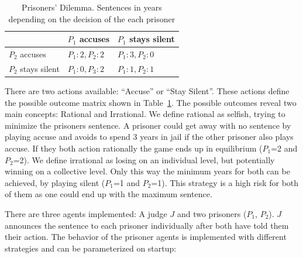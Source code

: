 \documentclass{acm_proc_article-sp}
\begin{document}
\begin{table}
\centering
\begin{tabular}{l | l | l}
                     & $P_1$ accuses    & $P_1$ stays silent\\
  \hline
  $P_2$ accuses      & $P_1: 2, P_2: 2$ & $P_1: 3, P_2: 0$ \\
  \hline
  $P_2$ stays silent & $P_1: 0, P_3: 2$ & $P_1: 1, P_2: 1$ \\
\end{tabular}
\caption{Prisoners' Dilemma. Sentences in years depending on the decision of the each prisoner}
\label{tab:prisoner-opt}
\end{table}

There are two actions available: ``Accuse'' or ``Stay Silent''. These actions define the possible outcome matrix shown in Table~\ref{tab:prisoner-opt}.
The possible outcomes reveal two main concepts: Rational and Irrational.
We define rational as selfish, trying to minimize the prisoners sentence.
A prisoner could get away with no sentence by playing accuse and avoids to spend 3 years in jail if the other prisoner also plays accuse.
If they both action rationally the game ends up in equilibrium ($P_1$=2 and $P_2$=2). 
We define irrational as losing on an individual level, but potentially winning on a collective level. Only this way the minimum years
for both can be achieved, by playing silent ($P_1$=1 and $P_2$=1).
This strategy is a high risk for both of them as one could end up with the maximum sentence.

There are three agents implemented: A judge $J$ and two prisoners ($P_1$, $P_2$).
$J$ announces the sentence 
to each prisoner individually after both have told them their action.
The behavior of the prisoner agents is implemented with different strategies and can be parameterized on startup:
\end{document}
